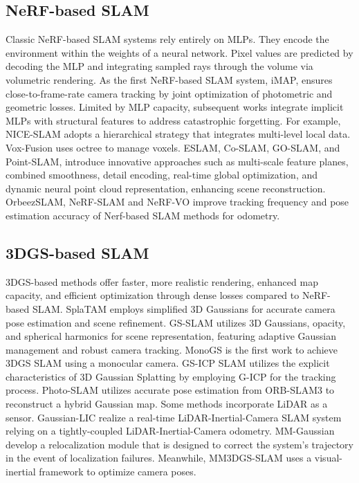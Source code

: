 \documentclass[lettersize,journal]{IEEEtran}
\begin{document}
\subsection{NeRF-based SLAM}
Classic NeRF-based SLAM systems rely entirely on MLPs. They encode the environment within the weights of a neural network. Pixel values are predicted by decoding the MLP and integrating sampled rays through the volume via volumetric rendering. As the first NeRF-based SLAM system, iMAP\cite{imap}, ensures close-to-frame-rate camera tracking by joint optimization of photometric and geometric losses. Limited by MLP capacity, subsequent works integrate implicit MLPs with structural features to address catastrophic forgetting. For example, NICE-SLAM\cite{niceslam} adopts a hierarchical strategy that integrates multi-level local data. Vox-Fusion uses octree to manage voxels. ESLAM\cite{esslam}, Co-SLAM\cite{coslam}, GO-SLAM\cite{goslam}, and Point-SLAM\cite{pointslam}, introduce innovative approaches such as multi-scale feature planes, combined smoothness, detail encoding, real-time global optimization, and dynamic neural point cloud representation, enhancing scene reconstruction. OrbeezSLAM\cite{orbeez}, NeRF-SLAM\cite{nerfslam} and NeRF-VO\cite{nerfvo} improve tracking frequency and pose estimation accuracy of Nerf-based SLAM methods for odometry.

\subsection{3DGS-based SLAM}
3DGS-based methods offer faster, more realistic rendering, enhanced map capacity, and efficient optimization through dense losses compared to NeRF-based SLAM. SplaTAM\cite{splatam} employs simplified 3D Gaussians for accurate camera pose estimation and scene refinement. GS-SLAM\cite{gsslam} utilizes 3D Gaussians, opacity, and spherical harmonics for scene representation, featuring adaptive Gaussian management and robust camera tracking. MonoGS\cite{monogs} is the first work to achieve 3DGS SLAM using a monocular camera. GS-ICP\cite{gsicp} SLAM utilizes the explicit characteristics of 3D Gaussian Splatting by employing G-ICP\cite{gicp} for the tracking process. Photo-SLAM\cite{photoslam} utilizes accurate pose estimation from ORB-SLAM3\cite{orbslam3} to reconstruct a hybrid Gaussian map. Some methods incorporate LiDAR as a sensor. Gaussian-LIC\cite{gaussianlic} realize a real-time LiDAR-Inertial-Camera SLAM system relying on a tightly-coupled LiDAR-Inertial-Camera odometry. MM-Gaussian\cite{mmgaussian} develop a relocalization module that is designed to correct the system’s trajectory in the event of localization failures. Meanwhile, MM3DGS-SLAM\cite{mm3dgs} uses a visual-inertial framework to optimize camera poses.
\end{document}
